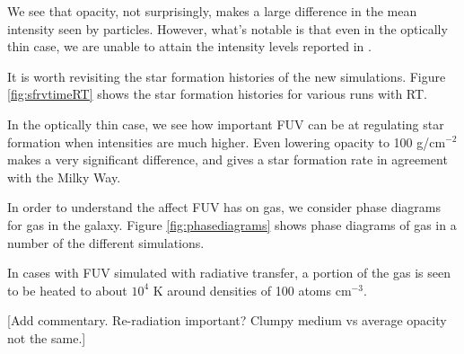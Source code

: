 We see that opacity, not surprisingly, makes a large difference in the mean intensity seen by particles. However, what's notable is that even in the optically thin case, we are unable to attain the intensity levels reported in \citet{wolfireEt03}.

It is worth revisiting the star formation histories of the new simulations. Figure \ref{fig:sfrvtimeRT} shows the star formation histories for various runs with RT.


In the optically thin case, we see how important FUV can be at regulating star formation when intensities are much higher. Even lowering opacity to 100 g/cm$^{-2}$ makes a very significant difference, and gives a star formation rate in agreement with the Milky Way.

In order to understand the affect FUV has on gas, we consider phase diagrams for gas in the galaxy. Figure \ref{fig:phasediagrams} shows phase diagrams of gas in a number of the different simulations.


In cases with FUV simulated with radiative transfer, a portion of the gas is seen to be heated to about $10^4$ K around densities of 100 atoms cm$^{-3}$.

[Add commentary. Re-radiation important? Clumpy medium vs average opacity not the same.]